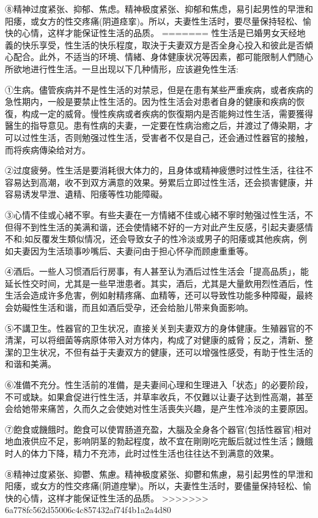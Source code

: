 \documentclass[12pt,UTF8]{ctexbook}
\begin{document}
⑧精神过度紧张、抑郁、焦虑。精神极度紧张、抑郁和焦虑，易引起男性的早泄和阳痿，或女方的性交疼痛(阴道痉挛)。所以，夫妻性生活时，要尽量保持轻松、愉快的心情，这样才能保证性生活的品质。
=======
性生活是已婚男女天经地義的快乐享受，性生活的快乐程度，取決于夫妻双方是否全身心投入和彼此是否傾心配合。此外，不适当的环境、情緒、身体健康状况等因素，都可能限制人們随心所欲地进行性生活。一旦出现以下几种情形，应该避免性生活:

①生病。儘管疾病并不是性生活的对禁忌，但是在患有某些严重疾病，或者疾病的急性期内，一般是要禁止性生活的。因为性生活会对患者自身的健康和疾病的恢復，构成一定的威脅。慢性疾病或者疾病的恢復期内是否能夠过性生活，需要獲得醫生的指导意见。患有性病的夫妻，一定要在性病治癒之后，并渡过了傳染期，才可以过性生活，否则勉强过性生活，受害者不仅是自己，还会通过性器官的接触，而将疾病傳染给对方。

②过度疲勞。性生活是要消耗很大体力的，且身体或精神疲憊时过性生活，往往不容易达到高潮，收不到双方满意的效果。勞累后立即过性生活，还会损害健康，并容易诱发早泄、遺精、阳痿等性功能障礙。

③心情不佳或心緒不寧。有些夫妻在一方情緒不佳或心緒不寧时勉强过性生活，不但得不到性生活的美满和谐，还会使情緒不好的一方对此产生反感，引起夫妻感情不和;如反覆发生類似情况，还会导致女子的性冷淡或男子的阳痿或其他疾病，例如夫妻因为生活琐事吵嘴后、夫妻问由于担心怀孕而顾慮重重等。

④酒后。一些人习惯酒后行房事，有人甚至认为酒后过性生活会「提高品质」，能延长性交时间，尤其是一些早泄患者。其实，酒后，尤其是大量飲用烈性酒后，性生活会造成许多危害，例如射精疼痛、血精等，还可以导致性功能多种障礙，最終会妨礙性生活和谐，而且如酒后受孕，还会给胎儿带来負面影响。

⑤不講卫生。性器官的卫生状况，直接关关到夫妻双方的身体健康。生殖器官的不清潔，可以将细菌等病原体带入对方体内，构成了对健康的威脅；反之，清新、整潔的卫生状况，不但有益于夫妻双方的健康，还可以增强性感受，有助于性生活的和谐和美满。

⑥准備不充分。性生活前的准備，是夫妻间心理和生理进入「状态」的必要阶段，不可或缺。如果倉促进行性生活，并草率收兵，不仅難以让妻子达到性高潮，甚至会给她带来痛苦，久而久之会使她对性生活喪失兴趣，是产生性冷淡的主要原因。

⑦飽食或饑餓时。飽食可以使胃肠道充盈，大腦及全身各个器官(包括性器官)相对地血液供应不足，影响阴茎的勃起程度，故不宜在剛剛吃完飯后就过性生活；饑餓时人的体力下降，精力不充沛，此时过性生活也往往达不到满意的效果。

⑧精神过度紧张、抑鬱、焦慮。精神极度紧张、抑鬱和焦慮，易引起男性的早泄和阳痿，或女方的性交疼痛(阴道痙攣)。所以，夫妻性生活时，要儘量保持轻松、愉快的心情，这样才能保证性生活的品质。
>>>>>>> 6a778fc562d55006c4c857432af74f4b1a2a4d80
\end{document}
